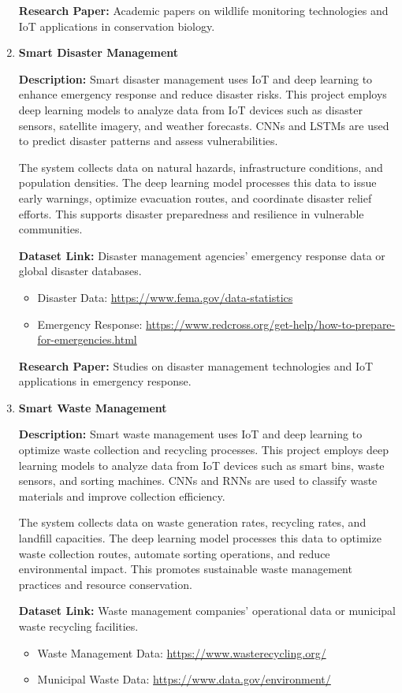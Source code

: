 \documentclass{article}
\begin{document}
\begin{enumerate}[label=\textbf{\arabic*.}, leftmargin=*]
\textbf{Research Paper:} Academic papers on wildlife monitoring technologies and IoT applications in conservation biology.

\item \textbf{Smart Disaster Management}

\textbf{Description:}
Smart disaster management uses IoT and deep learning to enhance emergency response and reduce disaster risks. This project employs deep learning models to analyze data from IoT devices such as disaster sensors, satellite imagery, and weather forecasts. CNNs and LSTMs are used to predict disaster patterns and assess vulnerabilities.

The system collects data on natural hazards, infrastructure conditions, and population densities. The deep learning model processes this data to issue early warnings, optimize evacuation routes, and coordinate disaster relief efforts. This supports disaster preparedness and resilience in vulnerable communities.

\textbf{Dataset Link:} Disaster management agencies' emergency response data or global disaster databases.
\begin{itemize}
    \item Disaster Data: \url{https://www.fema.gov/data-statistics}
    \item Emergency Response: \url{https://www.redcross.org/get-help/how-to-prepare-for-emergencies.html}
\end{itemize}

\textbf{Research Paper:} Studies on disaster management technologies and IoT applications in emergency response.

\item \textbf{Smart Waste Management}

\textbf{Description:}
Smart waste management uses IoT and deep learning to optimize waste collection and recycling processes. This project employs deep learning models to analyze data from IoT devices such as smart bins, waste sensors, and sorting machines. CNNs and RNNs are used to classify waste materials and improve collection efficiency.

The system collects data on waste generation rates, recycling rates, and landfill capacities. The deep learning model processes this data to optimize waste collection routes, automate sorting operations, and reduce environmental impact. This promotes sustainable waste management practices and resource conservation.

\textbf{Dataset Link:} Waste management companies' operational data or municipal waste recycling facilities.
\begin{itemize}
    \item Waste Management Data: \url{https://www.wasterecycling.org/}
    \item Municipal Waste Data: \url{https://www.data.gov/environment/}
\end{itemize}


\end{enumerate}
\end{document}

